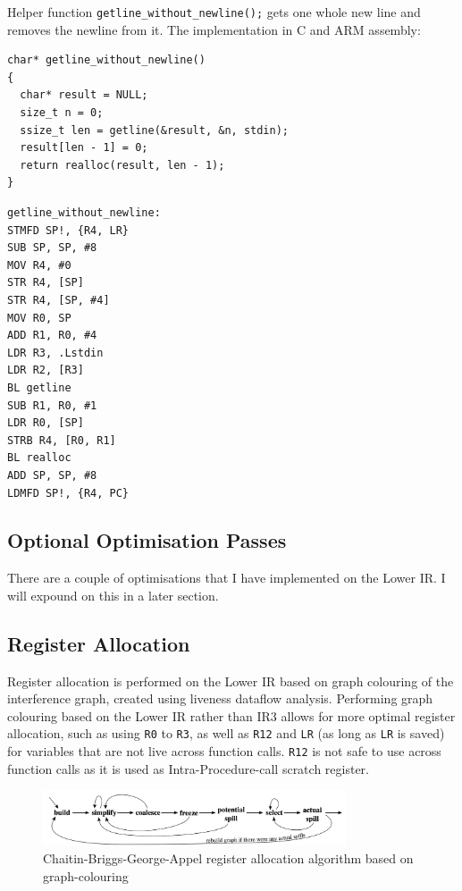 \documentclass[nonacm, acmsmall, screen, 10pt]{acmart}
\begin{document}
Helper function \texttt{getline_without_newline();} gets one whole new line and removes the newline from it.
The implementation in C and ARM assembly:
\begin{verbatim}
char* getline_without_newline()
{
  char* result = NULL;
  size_t n = 0;
  ssize_t len = getline(&result, &n, stdin);
  result[len - 1] = 0;
  return realloc(result, len - 1);
}
\end{verbatim}

\begin{verbatim}
getline_without_newline:
STMFD SP!, {R4, LR}
SUB SP, SP, #8
MOV R4, #0
STR R4, [SP]
STR R4, [SP, #4]
MOV R0, SP
ADD R1, R0, #4
LDR R3, .Lstdin
LDR R2, [R3]
BL getline
SUB R1, R0, #1
LDR R0, [SP]
STRB R4, [R0, R1]
BL realloc
ADD SP, SP, #8
LDMFD SP!, {R4, PC}
\end{verbatim}



\subsection{Optional Optimisation Passes}
There are a couple of optimisations that I have implemented on the Lower IR.
I will expound on this in a later section.

\subsection{Register Allocation}
Register allocation is performed on the Lower IR based on graph colouring of the interference graph, created using liveness dataflow analysis.
Performing graph colouring based on the Lower IR rather than IR3 allows for more optimal register allocation, such as using \texttt{R0} to \texttt{R3}, as well as \texttt{R12} and \texttt{LR} (as long as \texttt{LR} is saved) for variables that are not live across function calls.
\texttt{R12} is not safe to use across function calls as it is used as Intra-Procedure-call scratch register.

\begin{figure}[htpb]
  \centering
  \includegraphics[width=0.8\textwidth]{regallocgraph}
  \caption{Chaitin-Briggs-George-Appel register allocation algorithm based on graph-colouring}
  \label{fig:regallocgraph}
\end{figure}
\end{document}
